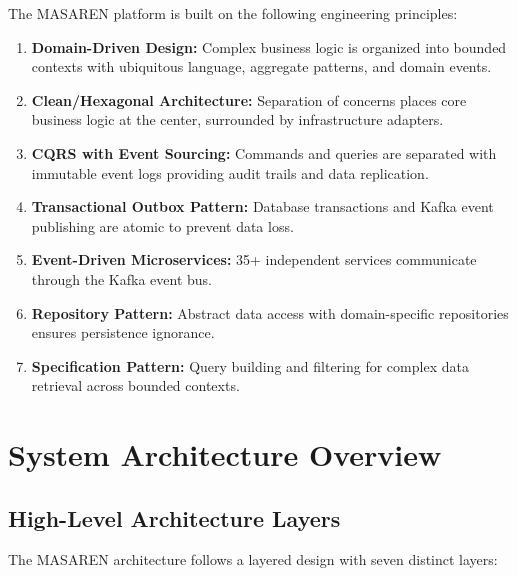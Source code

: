 \documentclass[11pt,a4paper]{article}
\begin{document}
The MASAREN platform is built on the following engineering principles:

\begin{enumerate}
  \item \textbf{Domain-Driven Design:} Complex business logic is organized into bounded contexts with ubiquitous language, aggregate patterns, and domain events.
  \item \textbf{Clean/Hexagonal Architecture:} Separation of concerns places core business logic at the center, surrounded by infrastructure adapters.
  \item \textbf{CQRS with Event Sourcing:} Commands and queries are separated with immutable event logs providing audit trails and data replication.
  \item \textbf{Transactional Outbox Pattern:} Database transactions and Kafka event publishing are atomic to prevent data loss.
  \item \textbf{Event-Driven Microservices:} 35+ independent services communicate through the Kafka event bus.
  \item \textbf{Repository Pattern:} Abstract data access with domain-specific repositories ensures persistence ignorance.
  \item \textbf{Specification Pattern:} Query building and filtering for complex data retrieval across bounded contexts.
\end{enumerate}

\clearpage

\section{System Architecture Overview}

\subsection{High-Level Architecture Layers}

The MASAREN architecture follows a layered design with seven distinct layers:
\end{document}
